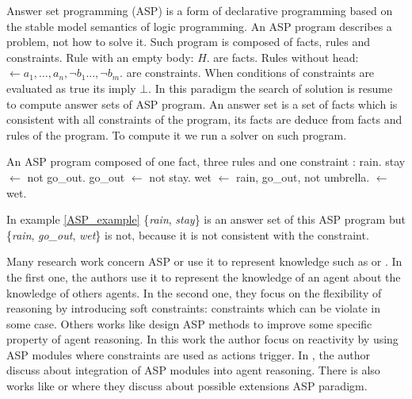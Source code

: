 \documentclass{aamas2012}
\begin{document}
	Answer set programming (ASP) is a form of declarative programming based on the stable model semantics of logic programming.
	An ASP program describes a problem, not how to solve it.
	Such program is composed of facts, rules and constraints. 
	Rule with an empty body: $H.$ are facts.
	Rules without head: $\leftarrow a_{1}, \ldots , a_{n}, \neg b_{1} \ldots, \neg b_{m}.$ are constraints.
	When conditions of constraints are evaluated as true its imply $\bot$.
	In this paradigm the search of solution is resume to compute answer sets of ASP program.
	An answer set is a set of facts which is consistent with all constraints of the program, its facts are deduce from facts and rules of the program.
	To compute it we run a solver on such program.
	
	\begin{example}
		\label{ASP_example}
		An ASP program composed of one fact, three rules and one constraint :\newline
		\newline
		rain.\newline
		stay $\leftarrow$ not go\_out.\newline
		go\_out $\leftarrow$ not stay.\newline
		wet $\leftarrow$ rain, go\_out, not umbrella.\newline
		$\leftarrow$ wet.
	\end{example}
	
	In example \ref{ASP_example} \{\emph{rain}, \emph{stay}\} is an answer set of this ASP program but \{\emph{rain}, \emph{go\_out}, \emph{wet}\} is not, 
	because it is not consistent with the constraint.
	
	Many research work concern ASP or use it to represent knowledge such as \cite{DBLP:conf/atal/BaralGSP10} or \cite{DBLP:conf/clima/NieuwenborghVHV06}.
	In the first one, the authors use it to represent the knowledge of an agent about the knowledge of others agents.
	In the second one, they focus on the flexibility of reasoning by introducing soft constraints: constraints which can be violate in some case.
	Others works like \cite{DBLP:conf/datalog/Costantini10} design ASP methods to improve some specific property of agent reasoning.
	In this work the author focus on reactivity by using ASP modules where constraints are used as actions trigger.
	In \cite{DBLP:conf/lpnmr/Costantini09}, the author discuss about integration of ASP modules into agent reasoning.
	There is also works like \cite{DBLP:conf/aaaiss/BaralAD06} or \cite{DBLP:conf/birthday/FaberW11} where they discuss about possible extensions ASP paradigm.
	
\end{document}
